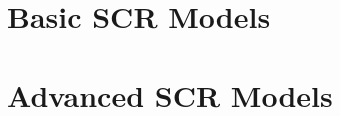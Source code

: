 \documentclass{book}
\begin{document}








\part{Basic SCR Models}



















\part{Advanced SCR Models}







\end{document}
